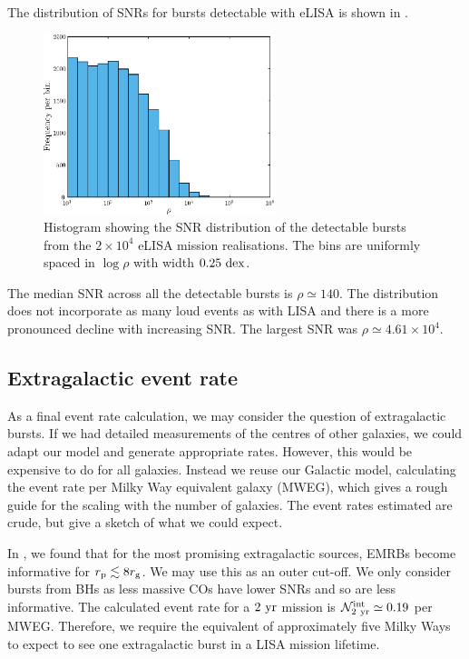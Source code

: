 The distribution of SNRs for bursts detectable with eLISA is shown in .
\begin{figure}%
\centering
   \includegraphics[width=0.6\textwidth]{./images/Fig_Detect_SNR_hist_eLISA}
\caption{Histogram showing the SNR distribution of the detectable bursts from the $2 \times 10^4$ eLISA mission realisations. The bins are uniformly spaced in $\log\rho$ with width $0.25~\mathrm{dex}$.}
\label{fig:SNR-hist}
\end{figure}
The median SNR across all the detectable bursts is $\rho \simeq 140$. The distribution does not incorporate as many loud events as with LISA and there is a more pronounced decline with increasing SNR. The largest SNR was $\rho \simeq 4.61 \times 10^4$. %

\subsection{Extragalactic event rate}\label{sec:extragal-events}

As a final event rate calculation, we may consider the question of extragalactic bursts. If we had detailed measurements of the centres of other galaxies, we could adapt our model and generate appropriate rates. However, this would be expensive to do for all galaxies. Instead we reuse our Galactic model, calculating the event rate per Milky Way equivalent galaxy (MWEG), which gives a rough guide for the scaling with the number of galaxies. The event rates estimated are crude, but give a sketch of what we could expect.

In , we found that for the most promising extragalactic sources, EMRBs become informative for $r_\mathrm{p} \lesssim 8 r_\mathrm{g}$. We may use this as an outer cut-off. We only consider bursts from BHs as less massive COs have lower SNRs and so are less informative. The calculated event rate for a $2~\mathrm{yr}$ mission is $\mathcal{N}_{2~\mathrm{yr}}^\mathrm{int} \simeq 0.19$ per MWEG. Therefore, we require the equivalent of approximately five Milky Ways to expect to see one extragalactic burst in a LISA mission lifetime.

